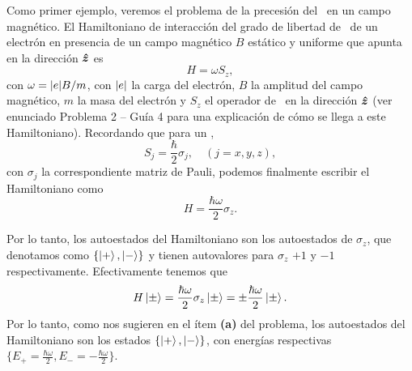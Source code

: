\documentclass[10pt, a4paper]{article}
\numberwithin{equation}{subsection}
\begin{document}
Como primer ejemplo, veremos el problema de la precesión del \spin\ en un campo
magnético. El Hamiltoniano de interacción del grado de libertad de \spinhalf\
de un electrón en presencia de un campo magnético $B$ estático y uniforme que
apunta en la dirección $\vu*{z}$ es
\begin{equation}
  H = \omega S_z,
\end{equation}
con $\omega = \abs{e}B/m$, con $\abs{e}$ la carga del electrón, $B$ la amplitud
del campo magnético, $m$ la masa del electrón y $S_z$ el operador de \spin\ en
la dirección $\vu*{z}$ (ver enunciado Problema 2 -- Guía 4 para una
explicación de cómo se llega a este Hamiltoniano). Recordando que para un
\spinhalf,
\begin{equation}
  S_j = \frac{\hbar}{2}\sigma_j, \quad\left(j = x, y, z\right),
\end{equation}
con $\sigma_j$ la correspondiente matriz de Pauli, podemos finalmente escribir
el Hamiltoniano como
\begin{equation}
  H = \frac{\hbar\omega}{2}\sigma_z.
\end{equation}

Por lo tanto, los autoestados del Hamiltoniano son los autoestados de
$\sigma_z$, que denotamos como $\set{\ket{+}, \ket{-}}$ y tienen autovalores
para $\sigma_z$ $+1$ y $-1$ respectivamente. Efectivamente tenemos que
\begin{equation}
  H\ket{\pm} = \frac{\hbar\omega}{2}\sigma_z\ket{\pm} =
  \pm\frac{\hbar\omega}{2}\ket{\pm}.
\end{equation}
Por lo tanto, como nos sugieren en el ítem \textbf{(a)} del problema, los
autoestados del Hamiltoniano son los estados $\set{\ket{+}, \ket{-}}$, con
energías respectivas $\{E_+ = \frac{\hbar\omega}{2}, E_- =
-\frac{\hbar\omega}{2}\}$.

\bigbreak
\end{document}
